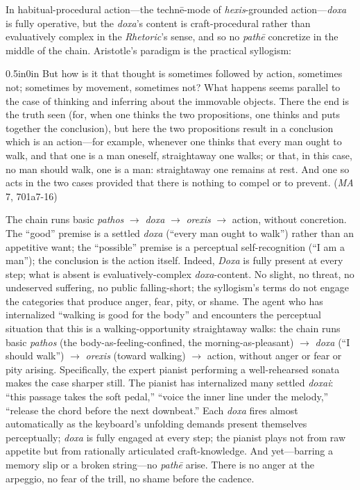\documentclass{article}
\begin{document}
In habitual-procedural action---the technē-mode of \textit{hexis}-grounded action---\textit{doxa} is fully operative, but the \textit{doxa}'s content is craft-procedural rather than evaluatively complex in the \textit{Rhetoric}'s sense, and so no \textit{pathē} concretize in the middle of the chain. Aristotle's paradigm is the practical syllogism:
\begin{adjustwidth}{0.5in}{0in}
But how is it that thought is sometimes followed by action, sometimes not; sometimes by movement, sometimes not? What happens seems parallel to the case of thinking and inferring about the immovable objects. There the end is the truth seen (for, when one thinks the two propositions, one thinks and puts together the conclusion), but here the two propositions result in a conclusion which is an action---for example, whenever one thinks that every man ought to walk, and that one is a man oneself, straightaway one walks; or that, in this case, no man should walk, one is a man: straightaway one remains at rest. And one so acts in the two cases provided that there is nothing to compel or to prevent. (\textit{MA} 7, 701a7-16)
\end{adjustwidth}
The chain runs basic \textit{pathos} $\rightarrow$ \textit{doxa} $\rightarrow$ \textit{orexis} $\rightarrow$ action, without concretion. The ``good'' premise is a settled \textit{doxa} (``every man ought to walk'') rather than an appetitive want; the ``possible'' premise is a perceptual self-recognition (``I am a man''); the conclusion is the action itself. Indeed, \textit{Doxa} is fully present at every step; what is absent is evaluatively-complex \textit{doxa}-content. No slight, no threat, no undeserved suffering, no public falling-short; the syllogism's terms do not engage the categories that produce anger, fear, pity, or shame. The agent who has internalized ``walking is good for the body'' and encounters the perceptual situation that this is a walking-opportunity straightaway walks: the chain runs basic \textit{pathos} (the body-as-feeling-confined, the morning-as-pleasant) $\rightarrow$ \textit{doxa} (``I should walk'') $\rightarrow$ \textit{orexis} (toward walking) $\rightarrow$ action, without anger or fear or pity arising. Specifically, the expert pianist performing a well-rehearsed sonata makes the case sharper still. The pianist has internalized many settled \textit{doxai}: ``this passage takes the soft pedal,'' ``voice the inner line under the melody,'' ``release the chord before the next downbeat.'' Each \textit{doxa} fires almost automatically as the keyboard's unfolding demands present themselves perceptually; \textit{doxa} is fully engaged at every step; the pianist plays not from raw appetite but from rationally articulated craft-knowledge. And yet---barring a memory slip or a broken string---no \textit{pathē} arise. There is no anger at the arpeggio, no fear of the trill, no shame before the cadence.
\end{document}
